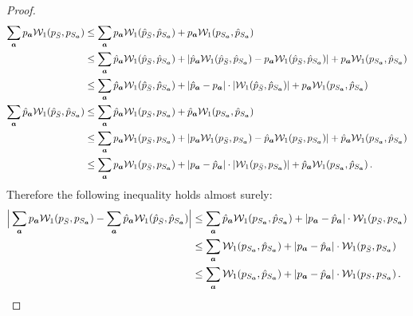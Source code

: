 \documentclass[letterpaper]{article}
\theoremstyle{definition}
\newcommand{\W}{\mathcal{W}}
\newcommand{\bS}{\bar{S}}
\begin{document}
\begin{proof}
\begin{align*}
    \sum_{\va} p_{\va} \W_1(p_{\bS}, p_{S_{\va}} ) &\leq \sum_{\va} p_{\va} \W_1( \hat{p}_{\bS}, \hat{p}_{S_{\va}}) + p_{\va}\W_1(p_{S_{\va}}, \hat{p}_{S_{\va}}) \\
    &\leq \sum_{\va} \hat{p}_{\va} \W_1( \hat{p}_{\bS}, \hat{p}_{S_{\va}}) +   |  \hat{p}_{\va} \W_1( \hat{p}_{\bS}, \hat{p}_{S_{\va}}) - p_{\va} \W_1( \hat{p}_{\bS}, \hat{p}_{S_{\va}})    | + p_{\va}\W_1(p_{S_{\va}}, \hat{p}_{S_{\va}}) \\
    & \leq \sum_{\va} \hat{p}_{\va} \W_1( \hat{p}_{\bS}, \hat{p}_{S_{\va}}) +   |  \hat{p}_{\va} - p_{\va} |\cdot|   \W_1( \hat{p}_{\bS}, \hat{p}_{S_{\va}}) | + p_{\va}\W_1(p_{S_{\va}}, \hat{p}_{S_{\va}})\\
         \sum_{\va} \hat{p}_{{\va}} \W_1( \hat{p}_{\bS}, \hat{p}_{S_{\va}})&\leq   \sum_{\va} \hat{p}_{\va} \W_1(p_{\bS}, p_{S_{\va}} ) +\hat{p}_{\va} \W_1(p_{S_{\va}}, \hat{p}_{S_{\va}}) \\
         &\leq \sum_{\va} p_{\va} \W_1(p_{\bS}, p_{S_{\va}} ) + |p_{\va} \W_1(p_{\bS}, p_{S_{\va}} )-\hat{p}_{\va} \W_1(p_{\bS}, p_{S_{\va}} ) | +\hat{p}_{\va} \W_1(p_{S_{\va}}, \hat{p}_{S_{\va}}) \\
         &\leq \sum_{\va} p_{\va} \W_1(p_{\bS}, p_{S_{\va}} ) + | p_{\va} - \hat{p}_{\va}|\cdot| \W_1(p_{\bS}, p_{S_{\va}} ) | +\hat{p}_{\va} \W_1(p_{S_{\va}}, \hat{p}_{S_{\va}})\,.
\end{align*}
Therefore the following inequality holds almost surely:
\begin{align*}
    \Big|  \sum_{\va}  p_{\va}\W_1(p_{\bS}, p_{S_{\va}} )-   \sum_{\va} \hat{p}_{\va} \W_1( \hat{p}_{\bS}, \hat{p}_{S_{\va}}) \Big| &\leq\sum_{\va}  \hat{p}_{\va} \W_1(p_{S_{\va}}, \hat{p}_{S_{\va}}) + | p_{\va} - \hat{p}_{\va}|\cdot \W_1(p_{\bS}, p_{S_{\va}} )  \\
    &\leq \sum_{\va}  \W_1(p_{S_{\va}}, \hat{p}_{S_{\va}}) + | p_{\va} - \hat{p}_{\va}|\cdot \W_1(p_{\bS}, p_{S_{\va}} )  \\
    &\leq \sum_{\va}  \W_1(p_{S_{\va}}, \hat{p}_{S_{\va}}) + | p_{\va} - \hat{p}_{\va}|\cdot  \W_1(p_{S}, p_{S_{\va}} )\,.
\end{align*}



\end{proof}
\end{document}
